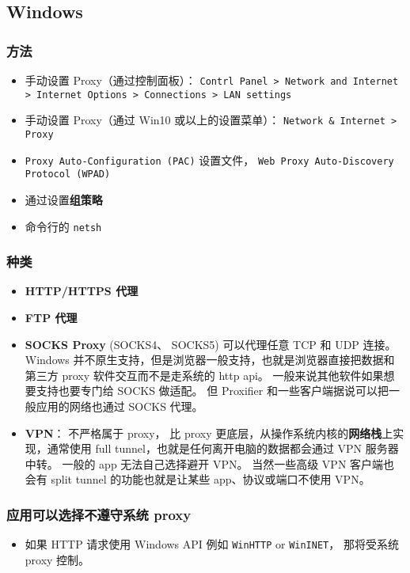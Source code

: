 
\subsection{Windows}

\subsubsection{方法}
\begin{itemize}
\item 手动设置 Proxy（通过控制面板）： \verb`Contrl Panel > Network and Internet > Internet Options > Connections > LAN settings`
\item 手动设置 Proxy（通过 Win10 或以上的设置菜单）： \verb`Network & Internet > Proxy`
\item \verb`Proxy Auto-Configuration (PAC)` 设置文件， \verb`Web Proxy Auto-Discovery Protocol (WPAD)`
\item 通过设置\textbf{组策略}
\item 命令行的 \verb`netsh`
\end{itemize}

\subsubsection{种类}
\begin{itemize}
\item \textbf{HTTP/HTTPS 代理}
\item \textbf{FTP 代理}
\item \textbf{SOCKS Proxy} (SOCKS4、 SOCKS5) 可以代理任意 TCP 和 UDP 连接。Windows 并不原生支持，但是浏览器一般支持，也就是浏览器直接把数据和第三方 proxy 软件交互而不是走系统的 http api。 一般来说其他软件如果想要支持也要专门给 SOCKS 做适配。 但 Proxifier 和一些客户端据说可以把一般应用的网络也通过 SOCKS 代理。
\item \textbf{VPN}： 不严格属于 proxy， 比 proxy 更底层，从操作系统内核的\textbf{网络栈}上实现，通常使用 full tunnel，也就是任何离开电脑的数据都会通过 VPN 服务器中转。 一般的 app 无法自己选择避开 VPN。 当然一些高级 VPN 客户端也会有 split tunnel 的功能也就是让某些 app、协议或端口不使用 VPN。
\end{itemize}

\subsubsection{应用可以选择不遵守系统 proxy}
\begin{itemize}
\item 如果 HTTP 请求使用 Windows API 例如 \verb`WinHTTP` or \verb`WinINET`， 那将受系统 proxy 控制。
\end{itemize}

